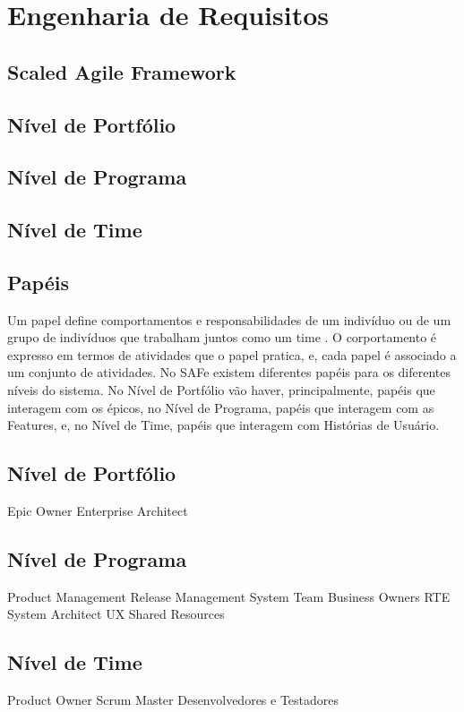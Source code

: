 \chapter[Engenharia de Requisitos]{Engenharia de Requisitos}

\section{Scaled Agile Framework}
\section{Nível de Portfólio}
\section{Nível de Programa}
\section{Nível de Time}

\section{Papéis}
Um papel define comportamentos e responsabilidades de um indivíduo ou de um grupo de indivíduos que trabalham juntos como um time \cite{kruchten002}. O corportamento é expresso em termos de atividades que o papel pratica, e, cada papel é associado a um conjunto de atividades. No SAFe existem diferentes papéis para os diferentes níveis do sistema. No Nível de Portfólio vão haver, principalmente, papéis que interagem com os épicos, no Nível de Programa, papéis que interagem com as Features, e, no Nível de Time, papéis que interagem com Histórias de Usuário.
\section{Nível de Portfólio}
Epic Owner
Enterprise Architect
\section{Nível de Programa}
Product Management
Release Management
System Team
Business Owners
RTE
System Architect
UX
Shared Resources

\section{Nível de Time}
Product Owner
Scrum Master
Desenvolvedores e Testadores
